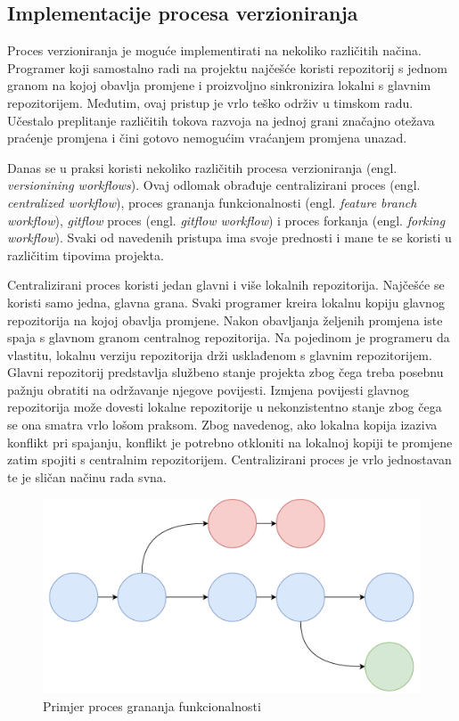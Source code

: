 \documentclass[times, utf8, diplomski, numeric]{fer}
\newcommand{\eng}[1]{(engl. \textit{#1})}
\begin{document}
\subsection{Implementacije procesa verzioniranja}

Proces verzioniranja je moguće implementirati na nekoliko različitih načina. Programer koji samostalno radi na projektu najčešće koristi repozitorij s jednom granom na kojoj obavlja promjene i proizvoljno sinkronizira lokalni s glavnim repozitorijem. Međutim, ovaj pristup je vrlo teško održiv u timskom radu. Učestalo preplitanje različitih tokova razvoja na jednoj grani značajno otežava praćenje promjena i čini gotovo nemogućim vraćanjem promjena unazad.

Danas se u praksi koristi nekoliko različitih procesa verzioniranja \eng{versionining workflows}. Ovaj odlomak obrađuje centralizirani proces \eng{centralized workflow}, proces grananja funkcionalnosti \eng{feature branch workflow}, \textit{gitflow} proces \eng{gitflow workflow} i proces forkanja \eng{forking workflow}. Svaki od navedenih pristupa ima svoje prednosti i mane te se koristi u različitim tipovima projekta\citep{versioningWorkflows}.

Centralizirani proces koristi jedan glavni i više lokalnih repozitorija. Najčešće se koristi samo jedna, glavna grana. Svaki programer kreira lokalnu kopiju glavnog repozitorija na kojoj obavlja promjene. Nakon obavljanja željenih promjena iste spaja s glavnom granom centralnog repozitorija. Na pojedinom je programeru da vlastitu, lokalnu verziju repozitorija drži usklađenom s glavnim repozitorijem. Glavni repozitorij predstavlja službeno stanje projekta zbog čega treba posebnu pažnju obratiti na održavanje njegove povijesti. Izmjena povijesti glavnog repozitorija može dovesti lokalne repozitorije u nekonzistentno stanje zbog čega se ona smatra vrlo lošom praksom. Zbog navedenog, ako lokalna kopija izaziva konflikt pri spajanju, konflikt je potrebno otkloniti na lokalnoj kopiji te promjene zatim spojiti s centralnim repozitorijem. Centralizirani proces je vrlo jednostavan te je sličan načinu rada svna.

\begin{figure}[b]
    \centering
    \includegraphics[scale=0.5]{FeatureBranch}
    \caption{Primjer proces grananja funkcionalnosti}
    \label{fig:FeatureBranch}
\end{figure}
\end{document}
